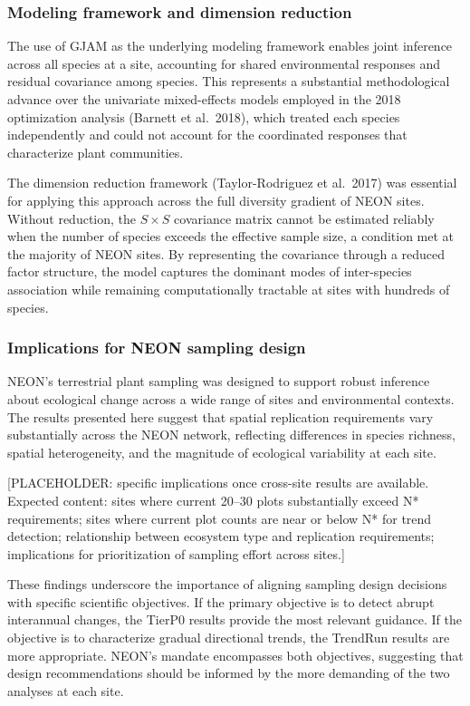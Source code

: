 \documentclass[
  11pt,
]{article}
\begin{document}
\subsubsection{Modeling framework and dimension
reduction}\label{modeling-framework-and-dimension-reduction}

The use of GJAM as the underlying modeling framework enables joint
inference across all species at a site, accounting for shared
environmental responses and residual covariance among species. This
represents a substantial methodological advance over the univariate
mixed-effects models employed in the 2018 optimization analysis (Barnett
et al.~2018), which treated each species independently and could not
account for the coordinated responses that characterize plant
communities.

The dimension reduction framework (Taylor-Rodriguez et al.~2017) was
essential for applying this approach across the full diversity gradient
of NEON sites. Without reduction, the \(S \times S\) covariance matrix
cannot be estimated reliably when the number of species exceeds the
effective sample size, a condition met at the majority of NEON sites. By
representing the covariance through a reduced factor structure, the
model captures the dominant modes of inter-species association while
remaining computationally tractable at sites with hundreds of species.

\subsubsection{Implications for NEON sampling
design}\label{implications-for-neon-sampling-design}

NEON's terrestrial plant sampling was designed to support robust
inference about ecological change across a wide range of sites and
environmental contexts. The results presented here suggest that spatial
replication requirements vary substantially across the NEON network,
reflecting differences in species richness, spatial heterogeneity, and
the magnitude of ecological variability at each site.

{[}PLACEHOLDER: specific implications once cross-site results are
available. Expected content: sites where current 20--30 plots
substantially exceed N* requirements; sites where current plot counts
are near or below N* for trend detection; relationship between ecosystem
type and replication requirements; implications for prioritization of
sampling effort across sites.{]}

These findings underscore the importance of aligning sampling design
decisions with specific scientific objectives. If the primary objective
is to detect abrupt interannual changes, the TierP0 results provide the
most relevant guidance. If the objective is to characterize gradual
directional trends, the TrendRun results are more appropriate. NEON's
mandate encompasses both objectives, suggesting that design
recommendations should be informed by the more demanding of the two
analyses at each site.
\end{document}
